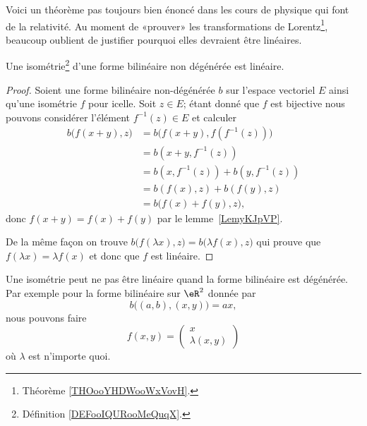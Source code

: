 Voici un théorème pas toujours bien énoncé dans les cours de physique qui font de la relativité. Au moment de «prouver» les transformations de Lorentz\footnote{Théorème \ref{THOooYHDWooWxVovH}.}, beaucoup oublient de justifier pourquoi elles devraient être linéaires.
\begin{theorem}     \label{ThoDsFErq}
	Une isométrie\footnote{Définition \ref{DEFooIQURooMeQuqX}.} d'une forme bilinéaire non dégénérée est linéaire.
\end{theorem}

\begin{proof}
	Soient une forme bilinéaire non-dégénérée \( b\) sur l'espace vectoriel \( E\) ainsi qu'une isométrie \( f\) pour icelle. Soit \( z\in E\); étant donné que \( f\) est bijective nous pouvons considérer l'élément \( f^{-1}(z)\in E\) et calculer
	\begin{subequations}
		\begin{align}
			b\big( f(x+y),z \big) & =b\big( f(x+y),f(f^{-1}(z)) \big) \\
			                      & =b(x+y,f^{-1}(z))                 \\
			                      & =b(x,f^{-1}(z))+b(y,f^{-1}(z))    \\
			                      & =b(f(x),z)+b(f(y),z)              \\
			                      & =b\big( f(x)+f(y),z \big),
		\end{align}
	\end{subequations}
	donc \( f(x+y)=f(x)+f(y)\) par le lemme~\ref{LemyKJpVP}.

	De la même façon on trouve \( b\big( f(\lambda x),z \big)=b\big( \lambda f(x),z \big)\) qui prouve que \( f(\lambda x)=\lambda f(x)\) et donc que \( f\) est linéaire.
\end{proof}

\begin{example}
	Une isométrie peut ne pas être linéaire quand la forme bilinéaire est dégénérée. Par exemple pour la forme bilinéaire sur \( \eR^2\) donnée par
	\begin{equation}
		b\big( (a,b),(x,y) \big)=ax,
	\end{equation}
	nous pouvons faire
	\begin{equation}
		f(x,y)=\begin{pmatrix}
			x \\
			\lambda(x,y)
		\end{pmatrix}
	\end{equation}
	où \( \lambda\) est n'importe quoi.
\end{example}

